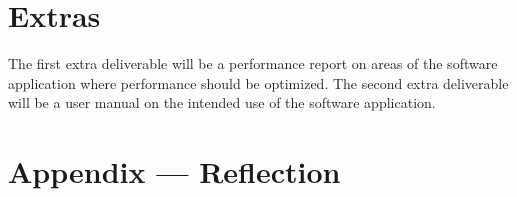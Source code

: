 \documentclass{article}
\begin{document}
\section{Extras}

\par{The first extra deliverable will be a performance report on areas of the software application where performance should be optimized. 
The second extra deliverable will be a user manual on the intended use of the software application.}



\newpage{}

\section*{Appendix --- Reflection}



\end{document}
